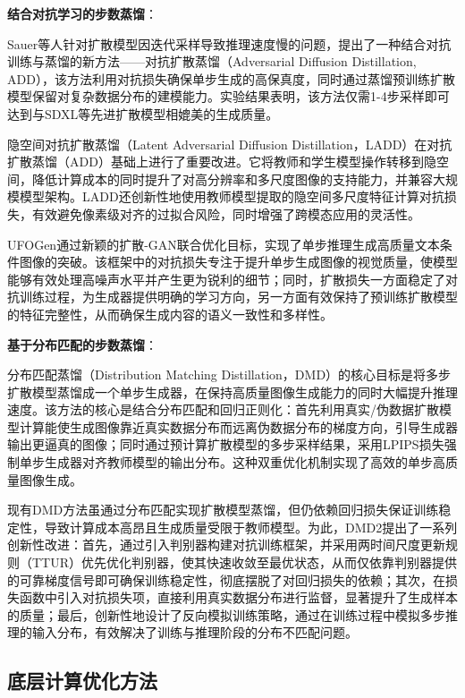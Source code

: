 \documentclass[11pt,a4paper,UTF8]{ctexart}
\begin{document}
\textbf{结合对抗学习的步数蒸馏}：

Sauer等人\cite{sauer2024adversarial}针对扩散模型因迭代采样导致推理速度慢的问题，提出了一种结合对抗训练与蒸馏的新方法——对抗扩散蒸馏（Adversarial Diffusion Distillation, ADD），该方法利用对抗损失确保单步生成的高保真度，同时通过蒸馏预训练扩散模型保留对复杂数据分布的建模能力。实验结果表明，该方法仅需1-4步采样即可达到与SDXL\cite{podell2023sdxl}等先进扩散模型相媲美的生成质量。

隐空间对抗扩散蒸馏（Latent Adversarial Diffusion Distillation，LADD）\cite{sauer2024fast}在对抗扩散蒸馏（ADD）基础上进行了重要改进。它将教师和学生模型操作转移到隐空间，降低计算成本的同时提升了对高分辨率和多尺度图像的支持能力，并兼容大规模模型架构。LADD还创新性地使用教师模型提取的隐空间多尺度特征计算对抗损失，有效避免像素级对齐的过拟合风险，同时增强了跨模态应用的灵活性。

UFOGen\cite{xu2024ufogen}通过新颖的扩散-GAN联合优化目标，实现了单步推理生成高质量文本条件图像的突破。该框架中的对抗损失专注于提升单步生成图像的视觉质量，使模型能够有效处理高噪声水平并产生更为锐利的细节；同时，扩散损失一方面稳定了对抗训练过程，为生成器提供明确的学习方向，另一方面有效保持了预训练扩散模型的特征完整性，从而确保生成内容的语义一致性和多样性。

\textbf{基于分布匹配的步数蒸馏}：

分布匹配蒸馏（Distribution Matching Distillation，DMD）\cite{yin2024one}的核心目标是将多步扩散模型蒸馏成一个单步生成器，在保持高质量图像生成能力的同时大幅提升推理速度。该方法的核心是结合分布匹配和回归正则化：首先利用真实/伪数据扩散模型计算能使生成图像靠近真实数据分布而远离伪数据分布的梯度方向，引导生成器输出更逼真的图像；同时通过预计算扩散模型的多步采样结果，采用LPIPS损失\cite{zhang2018unreasonable}强制单步生成器对齐教师模型的输出分布。这种双重优化机制实现了高效的单步高质量图像生成。

现有DMD方法虽通过分布匹配实现扩散模型蒸馏，但仍依赖回归损失保证训练稳定性，导致计算成本高昂且生成质量受限于教师模型。为此，DMD2\cite{yin2024improved}提出了一系列创新性改进：首先，通过引入判别器构建对抗训练框架，并采用两时间尺度更新规则（TTUR）优先优化判别器，使其快速收敛至最优状态，从而仅依靠判别器提供的可靠梯度信号即可确保训练稳定性，彻底摆脱了对回归损失的依赖；其次，在损失函数中引入对抗损失项，直接利用真实数据分布进行监督，显著提升了生成样本的质量；最后，创新性地设计了反向模拟训练策略，通过在训练过程中模拟多步推理的输入分布，有效解决了训练与推理阶段的分布不匹配问题。


\subsection{底层计算优化方法}
\end{document}
